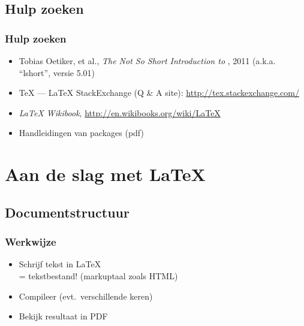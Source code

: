 \documentclass[aspectratio=169]{beamer}
\begin{document}
\subsection{Hulp zoeken}

\begin{frame}
  \frametitle{Hulp zoeken}

  \begin{itemize}
    \item Tobias Oetiker, et al., \emph{The Not So Short Introduction to {\LaTeXe}}, 2011 (a.k.a. ``lshort'', versie 5.01)
    \item {\TeX} --- {\LaTeX} StackExchange (Q \& A site): \url{http://tex.stackexchange.com/}
    \item \emph{{\LaTeX} Wikibook}, \url{http://en.wikibooks.org/wiki/LaTeX}
    \item Handleidingen van packages (pdf)
  \end{itemize}

\end{frame}

\section{Aan de slag met {\LaTeX}}

\subsection{Documentstructuur}

\begin{frame}
  \frametitle{Werkwijze}

  \begin{itemize}
    \item<+-> Schrijf tekst in {\LaTeX}\\
    = tekstbestand! (markuptaal zoals HTML)
    \item<+-> Compileer (evt.\ verschillende keren)
    \item<+-> Bekijk resultaat in PDF
  \end{itemize}
\end{frame}
\end{document}
